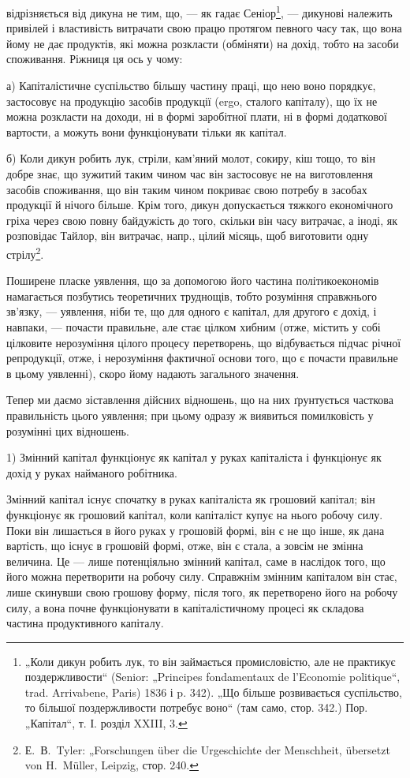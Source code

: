 \parcont{}  %
відрізняється від дикуна не тим, що, — як гадає Сеніор\footnote{
„Коли дикун робить лук, то він займається промисловістю, але не практикує
поздержливости“ (Senior: „Principes fondamentaux de l’Economie politique“,
trad. Arrivabene, Paris) 1836 і p. 342). „Що більше розвивається суспільство, то
більшої поздержливости потребує воно“ (там само, стор. 342.) Пор. „Капітал“,
т. І. розділ XXIII, 3.
}, — дикунові
належить привілей і властивість витрачати свою працю протягом певного
часу так, що вона йому не дає продуктів, які можна розкласти (обміняти)
на дохід, тобто на засоби споживання. Ріжниця ця ось у чому:

а) Капіталістичне суспільство більшу частину праці, що нею воно
порядкує, застосовує на продукцію засобів продукції (ergo, сталого
капіталу), що їх не можна розкласти на доходи, ні в формі заробітної
плати, ні в формі додаткової вартости, а можуть вони функціонувати
тільки як капітал.

б) Коли дикун робить лук, стріли, кам’яний молот, сокиру, кіш тощо,
то він добре знає, що зужитий таким чином час він застосовує не на
виготовлення засобів споживання, що він таким чином покриває свою
потребу в засобах продукції й нічого більше. Крім того, дикун допускається
тяжкого економічного гріха через свою повну байдужість до того,
скільки він часу витрачає, а іноді, як розповідає Тайлор, він витрачає,
напр., цілий місяць, щоб виготовити одну стрілу\footnote{
Е.~В.~Tyler: „Forschungen über die Urgeschichte der Menschheit, übersetzt
von H.~Müller, Leipzig, стор. 240.
}.

Поширене пласке уявлення, що за допомогою його частина політикоекономів
намагається позбутись теоретичних труднощів, тобто розуміння
справжнього зв’язку, — уявлення, ніби те, що для одного є капітал, для
другого є дохід, і навпаки, — почасти правильне, але стає цілком хибним
(отже, містить у собі цілковите нерозуміння цілого процесу перетворень,
що відбувається підчас річної репродукції, отже, і нерозуміння фактичної
основи того, що є почасти правильне в цьому уявленні), скоро йому
надають загального значення.

Тепер ми даємо зіставлення дійсних відношень, що на них ґрунтується
часткова правильність цього уявлення; при цьому одразу ж виявиться
помилковість у розумінні цих відношень.

1) Змінний капітал функціонує як капітал у руках капіталіста і функціонує
як дохід у руках найманого робітника.

Змінний капітал існує спочатку в руках капіталіста як грошовий
капітал; він функціонує як грошовий капітал, коли капіталіст
купує на нього робочу силу. Поки він лишається в його руках у грошовій
формі, він є не що інше, як дана вартість, що існує в грошовій
формі, отже, він є стала, а зовсім не змінна величина. Це — лише потенціяльно
змінний капітал, саме в наслідок того, що його можна перетворити
на робочу силу. Справжнім змінним капіталом він стає, лише скинувши
свою грошову форму, після того, як перетворено його на робочу
силу, а вона почне функціонувати в капіталістичному процесі як складова
частина продуктивного капіталу.
